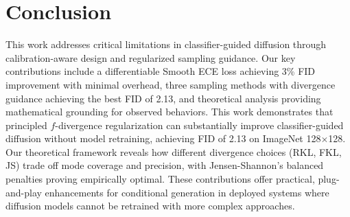 \documentclass{article}
\begin{document}
\section{Conclusion}


This work addresses critical limitations in classifier-guided diffusion through calibration-aware design and regularized sampling guidance. Our key contributions include a differentiable Smooth ECE loss achieving 3\% FID improvement with minimal overhead, three sampling methods with divergence guidance achieving the best FID of 2.13, and theoretical analysis providing mathematical grounding for observed behaviors.
This work demonstrates that principled $f$-divergence regularization can substantially improve classifier-guided diffusion without model retraining, achieving FID of 2.13 on ImageNet 128$\times$128. Our theoretical framework reveals how different divergence choices (RKL, FKL, JS) trade off mode coverage and precision, with Jensen-Shannon's balanced penalties proving empirically optimal. These contributions offer practical, plug-and-play enhancements for conditional generation in deployed systems where diffusion models cannot be retrained with more complex approaches.








\appendix
\end{document}
